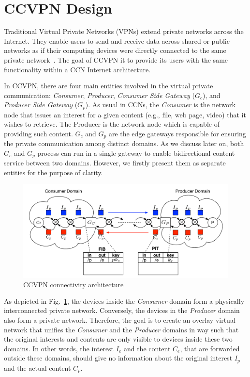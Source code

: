 \section{CCVPN Design}\label{metho}

Traditional Virtual Private Networks (VPNs) extend private networks across the Internet.
They enable users to send and receive data across shared or public networks as if their
computing devices were directly connected to the same private network~\cite{khanvilkar2004virtual}.
The goal of CCVPN it to provide its users with the same functionality within a CCN Internet architecture.

In CCVPN, there are four main entities involved in the virtual private communication: \textit{Consumer}, \textit{Producer}, \textit{Consumer Side Gateway} ($G_c$), and \textit{Producer Side Gateway} ($G_p$).
As usual in CCNs, the \textit{Consumer} is the network node that issues an interest for a given content
(e.g., file, web page, video) that it wishes to retrieve. The Producer is the network node which is
capable of providing such content. $G_c$ and $G_p$ are the edge gateways responsible for ensuring the
private communication among distinct domains. As we discuss later on, both $G_c$ and $G_p$ process can
run in a single gateway to enable bidirectional content service between two domains. However, we
firstly present them as separate entities for the purpose of clarity.

\begin{figure}
\centering
\includegraphics[width=\columnwidth]{images/architecture.pdf}
\caption{CCVPN connectivity architecture}
\label{fig:ccvpn}
\end{figure}

As depicted in Fig.~\ref{fig:ccvpn}, the devices inside the \textit{Consumer} domain form a physically
interconnected private network. Conversely, the devices in the \textit{Producer} domain also form a
private network. Therefore, the goal is to create an overlay virtual network that unifies
the \textit{Consumer} and the \textit{Producer} domains in way such that the original interests
and contents are only visible to devices inside these two domains. In other words, the interest
$I_e$ and the content $C_e$, that are forwarded outside these domains, should give no information
about the original interest $I_p$ and the actual content $C_p$.

